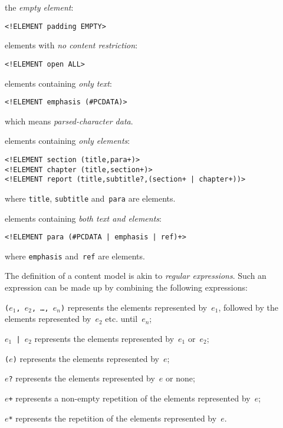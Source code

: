 \begin{enumerate*}

  \item the \emph{empty element}:
\begin{verbatim}
<!ELEMENT padding EMPTY>
\end{verbatim}

  \item elements with \emph{no content restriction}:
\begin{verbatim}
<!ELEMENT open ALL>
\end{verbatim}

  \item elements containing \emph{only text}:
\begin{verbatim}
<!ELEMENT emphasis (#PCDATA)>
\end{verbatim}
which means \emph{parsed\hyp{}character data}.

\bigskip

  \item elements containing \emph{only elements}:
\begin{verbatim}
<!ELEMENT section (title,para+)>
<!ELEMENT chapter (title,section+)>
<!ELEMENT report (title,subtitle?,(section+ | chapter+))>
\end{verbatim}
where \texttt{title}, \texttt{subtitle} and~\texttt{para} are
elements.

\bigskip

  \item elements containing \emph{both text and elements}:
\begin{verbatim}
<!ELEMENT para (#PCDATA | emphasis | ref)+>
\end{verbatim}
where \texttt{emphasis} and~\texttt{ref} are elements.
\end{enumerate*}
The definition of a content model is akin to \emph{regular
  expressions}. Such an expression can be made up by combining the
following expressions:
\begin{itemize*}

  \item \texttt{(\(e_1\), \(e_2\), \dots, \(e_n\))} represents the
    elements represented by~\(e_1\), followed by the elements
    represented by~\(e_2\) etc. until~\(e_n\);

  \item \texttt{\(e_1\) | \(e_2\)} represents the elements represented
    by~\(e_1\) or~\(e_2\);

  \item \texttt{(\(e\))} represents the elements represented by~\(e\);

  \item \texttt{\(e\)?} represents the elements represented by~\(e\)
    or none;

  \item \texttt{\(e\)+} represents a non\hyp{}empty repetition of
    the elements represented by~\(e\);

  \item \texttt{\(e\)*} represents the repetition of the elements
    represented by~\(e\).

\end{itemize*}
